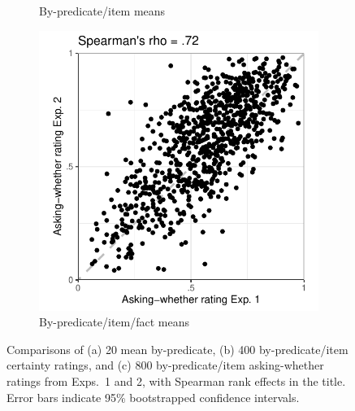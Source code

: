 \documentclass[11pt,fleqn]{article}
\newcommand{\6}{\mbox{$[\hspace*{-.6mm}[$}}
\newcommand{\9}{\mbox{$]\hspace*{-.6mm}]$}}
\begin{document}
\begin{figure}[h!]
\begin{subfigure}[t]{.3\textwidth}
\caption{By-predicate/item means}
\end{subfigure}\hfill
\begin{subfigure}[t]{.3\textwidth}
\centering
\includegraphics[width=\textwidth]{../../results/exp1/graphs/SUP-ai-PredItemFact-Exp1-by-Exp2}
\caption{By-predicate/item/fact means}
\end{subfigure}  
\caption{Comparisons of (a) 20 mean by-predicate, (b) 400 by-predicate/item certainty ratings, and (c) 800 by-predicate/item asking-whether ratings from Exps.~1 and 2,  with Spearman rank effects in the title. Error bars indicate 95\% bootstrapped confidence intervals.}\label{fig:SUP-ai-comparison}
\end{figure}
\end{document}
